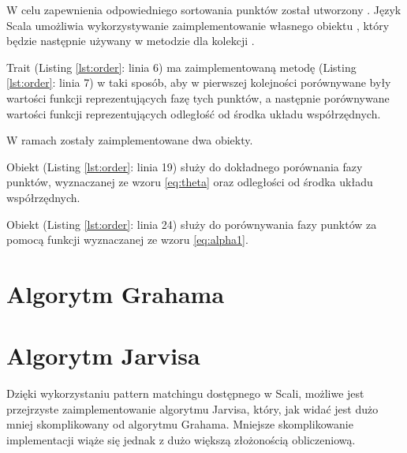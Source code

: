    		W celu zapewnienia odpowiedniego sortowania punktów został utworzony . Język Scala umożliwia wykorzystywanie zaimplementowanie własnego obiektu , który będzie następnie używany w metodzie  dla kolekcji .
   		
   	 	Trait  (Listing \ref{lst:order}: linia 6) ma zaimplementowaną metodę  (Listing \ref{lst:order}: linia 7) w taki sposób, aby w pierwszej kolejności porównywane były wartości funkcji reprezentujących fazę tych punktów, a następnie porównywane wartości funkcji reprezentujących odległość od środka układu współrzędnych.
   	 	
   	 	W ramach  zostały zaimplementowane dwa obiekty.
   	 	
   	 	Obiekt  (Listing \ref{lst:order}: linia 19) służy do dokładnego porównania fazy punktów, wyznaczanej ze wzoru \ref{eq:theta} oraz odległości od środka układu współrzędnych. 
   	 	
   	 	Obiekt  (Listing \ref{lst:order}: linia 24) służy do porównywania fazy punktów za pomocą funkcji wyznaczanej ze wzoru \ref{eq:alpha1}.
   		
   		\listingsource
   		\newpage
   		
   		\listingsource
   		\newpage
   		
   		\listingsource
   		\newpage
   		\section{Algorytm Grahama}
   		
   		\mysource
   		\newpage
   		
   		\listingsource
   		\newpage
   		
   		\listingsource
   		\section{Algorytm Jarvisa}
   		Dzięki wykorzystaniu pattern matchingu dostępnego w Scali, możliwe jest przejrzyste zaimplementowanie algorytmu Jarvisa, który, jak widać jest dużo mniej skomplikowany od algorytmu Grahama. Mniejsze skomplikowanie implementacji wiąże się jednak z dużo większą złożonością obliczeniową.
        
        \listingsource
        
        \listingsource
